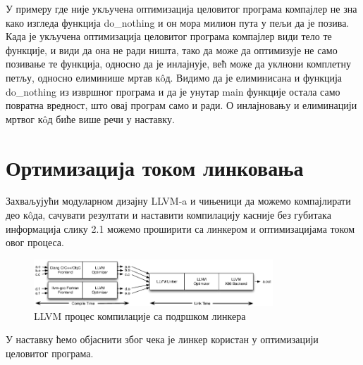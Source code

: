 \documentclass[12pt,oneside]{memoir}
\begin{document}
У примеру где није укључена оптимизација целовитог програма компајлер не зна како
изгледа функција do{\_}nothing и он мора милион пута у пељи да је позива.
Када је укључена оптимизација целовитог програма компајлер види тело те функције,
и види да она не ради ништа, тако да може да оптимизује не само позивање те функција,
односно да је инлајнује, већ може да уклнони комплетну петљу, односно елиминише мртав 
к\^{o}д.
Видимо да је елиминисана и функција do{\_}nothing из извршног програма и да је унутар
main функције остала само повратна вредност, што овај програм само и ради.
О инлајновању и елиминацији мртвог к\^{o}д биће више речи у наставку.

\section{Ортимизација током линковања}


Захваљујући модуларном дизајну LLVM-a и чињеници да можемо компајлирати део к\^{o}да,
сачувати резултати и наставити компилацију касније без губитака информација
слику 2.1 можемо проширити са линкером и оптимизацијама током овог процеса.

\begin{figure}[!ht]
  \centering
  \includegraphics[width=0.8\textwidth]{LTO.png}
  \caption{LLVM процес компилације са подршком линкера}
  \label{fig:grafikon}
\end{figure}


У наставку ћемо објаснити због чека је линкер користан у оптимизацији целовитог програма.
\end{document}
